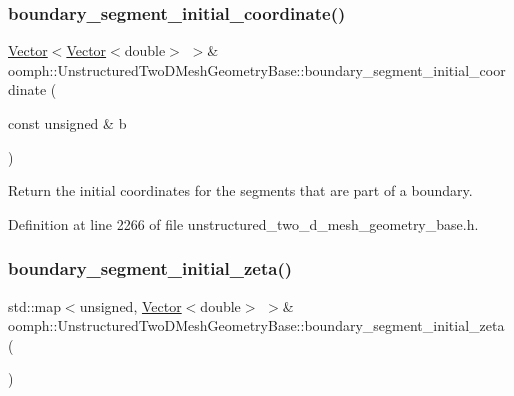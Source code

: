 \subsubsection{\texorpdfstring{boundary\+\_\+segment\+\_\+initial\+\_\+coordinate()}{boundary\_segment\_initial\_coordinate()}\hspace{0.1cm}{\footnotesize\ttfamily [2/2]}}
{\footnotesize\ttfamily \hyperlink{classoomph_1_1Vector}{Vector}$<$\hyperlink{classoomph_1_1Vector}{Vector}$<$double$>$ $>$\& oomph\+::\+Unstructured\+Two\+D\+Mesh\+Geometry\+Base\+::boundary\+\_\+segment\+\_\+initial\+\_\+coordinate (\begin{DoxyParamCaption}\item[{const unsigned \&}]{b }\end{DoxyParamCaption})\hspace{0.3cm}{\ttfamily [inline]}}



Return the initial coordinates for the segments that are part of a boundary. 



Definition at line 2266 of file unstructured\+\_\+two\+\_\+d\+\_\+mesh\+\_\+geometry\+\_\+base.\+h.

\mbox{\label{classoomph_1_1UnstructuredTwoDMeshGeometryBase_a437a73c9d0b078c121c254ed2e8cd487}} 
\subsubsection{\texorpdfstring{boundary\+\_\+segment\+\_\+initial\+\_\+zeta()}{boundary\_segment\_initial\_zeta()}\hspace{0.1cm}{\footnotesize\ttfamily [1/2]}}
{\footnotesize\ttfamily std\+::map$<$unsigned, \hyperlink{classoomph_1_1Vector}{Vector}$<$double$>$ $>$\& oomph\+::\+Unstructured\+Two\+D\+Mesh\+Geometry\+Base\+::boundary\+\_\+segment\+\_\+initial\+\_\+zeta (\begin{DoxyParamCaption}{ }\end{DoxyParamCaption})\hspace{0.3cm}{\ttfamily [inline]}}



